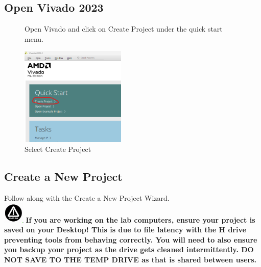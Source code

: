 \subsection{Open Vivado 2023}
    
    \ifpdf
        \begin{figure}[H]
        Open Vivado and click on Create Project under the quick start menu. 

            \centering
            \includegraphics[width=5cm]{Images/Vivado_CreateProject.png}
            \caption{Select Create Project}
            \label{fig:enter-label}
        \end{figure}
    \else
    \fi

\subsection{Create a New Project}
    Follow along with the Create a New Project Wizard.\\
    \vspace{1cm}
    \includegraphics[width = 1cm]{Images/Alert Icon.png} \textbf{
    If you are working on the lab computers, ensure your project is saved on your Desktop!
    This is due to file latency with the H drive preventing tools from behaving correctly.
    You will need to also ensure you backup your project as the drive gets cleaned intermittently.
    DO NOT SAVE TO THE TEMP DRIVE as that is shared between users.}

    \vspace{1cm}
    
